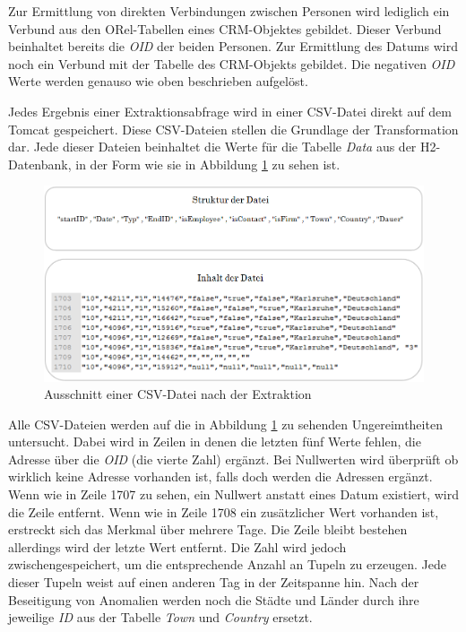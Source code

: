 Zur Ermittlung von direkten Verbindungen zwischen Personen wird lediglich ein Verbund aus den ORel-Tabellen eines CRM-Objektes gebildet. Dieser Verbund beinhaltet bereits die \textit{OID} der beiden Personen. Zur Ermittlung des Datums wird noch ein Verbund mit der Tabelle des CRM-Objekts gebildet. Die negativen \textit{OID} Werte werden genauso wie oben beschrieben aufgelöst. 

Jedes Ergebnis einer Extraktionsabfrage wird in einer CSV-Datei direkt auf dem Tomcat gespeichert. Diese CSV-Dateien stellen die Grundlage der Transformation dar. Jede dieser Dateien beinhaltet die Werte für die Tabelle \textit{Data} aus der H2-Datenbank, in der Form wie sie in Abbildung \ref{fig:umsetzung_csv_datei} zu sehen ist. 

\begin{figure}[htbp]
\begin{center}
\includegraphics[width=1.0\textwidth]{pics/umsetzung_csv_datei.png}
\caption{Ausschnitt einer CSV-Datei nach der Extraktion}
\label{fig:umsetzung_csv_datei}
\end{center}
\end{figure}

Alle CSV-Dateien werden auf die in Abbildung \ref{fig:umsetzung_csv_datei} zu sehenden Ungereimtheiten untersucht. Dabei wird in Zeilen in denen die letzten fünf Werte fehlen, die Adresse über die \textit{OID} (die vierte Zahl) ergänzt. Bei Nullwerten wird überprüft ob wirklich keine Adresse vorhanden ist, falls doch werden die Adressen ergänzt. Wenn wie in Zeile 1707 zu sehen, ein Nullwert anstatt eines Datum existiert, wird die Zeile entfernt. Wenn wie in Zeile 1708 ein zusätzlicher Wert vorhanden ist, erstreckt sich das Merkmal über mehrere Tage. Die Zeile bleibt bestehen allerdings wird der letzte Wert entfernt. Die Zahl wird jedoch zwischengespeichert, um die entsprechende Anzahl an Tupeln zu erzeugen. Jede dieser Tupeln weist auf einen anderen Tag in der Zeitspanne hin. Nach der Beseitigung von Anomalien werden noch die Städte und Länder durch ihre jeweilige \textit{ID} aus der Tabelle \textit{Town} und \textit{Country} ersetzt.

